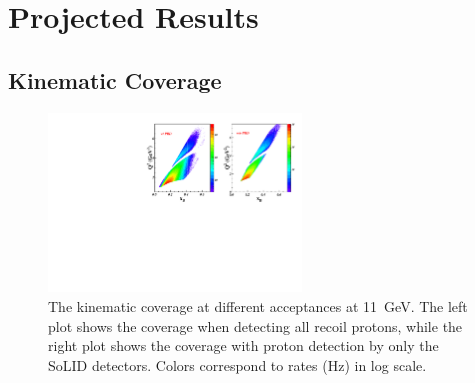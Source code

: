 \section{Projected Results}

\subsection{Kinematic Coverage}

\begin{figure}[!ht]
 \begin{center}
      \includegraphics[type=pdf,
        ext=.pdf,read=.pdf,width=0.6\textwidth]{./figures/E11_Q2_x_epip_Q2gt1}
 \caption[The kinematic coverage at different acceptances.]{\footnotesize{The
     kinematic coverage at different acceptances at 11~GeV. The left plot
     shows the coverage when detecting all recoil protons, while the right plot
     shows the coverage with proton detection by only the SoLID
     detectors. Colors correspond to rates (Hz) in log scale.}}
  \label{kin_cor}
  \end{center}
\end{figure}

